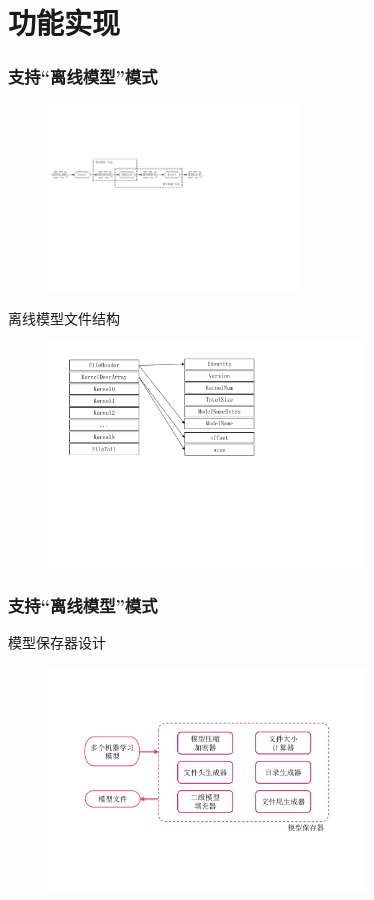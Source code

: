 \documentclass[12pt]{ctexbeamer}
\begin{document}
\section{功能实现}
\begin{frame}
  \frametitle{支持“离线模型”模式}
  \begin{figure}
      \includegraphics[width=0.6\textwidth]{figures/offline_process.pdf}
  \end{figure}
  \begin{block}{离线模型文件结构}
      \begin{figure}
         \includegraphics[width=0.75\textwidth]{figures/offmodel_struct.pdf}
      \end{figure}
  \end{block}
\end{frame}

\begin{frame}
  \frametitle{支持“离线模型”模式}
    \begin{block}{模型保存器设计}
      \begin{figure}
         \includegraphics[width=0.75\textwidth]{figures/model_save.pdf}
      \end{figure}  
    \end{block}
\end{frame}
\end{document}
